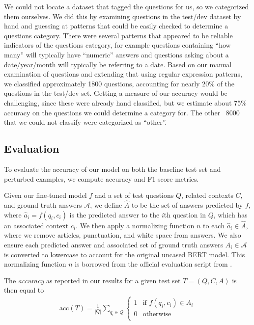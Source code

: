 \documentclass[11pt,a4paper]{article}
\begin{document}
We could not locate a dataset that tagged the questions for us, so we categorized them ourselves. We did this by examining questions in the test/dev dataset by hand and guessing at patterns that could be easily checked to determine a questions category. There were several patterns that appeared to be reliable indicators of the questions category, for example questions containing ``how many'' will typically have ``numeric'' answers and questions asking about a date/year/month will typically be referring to a date. Based on our manual examination of questions and extending that using regular expression patterns, we classified approximately 1800 questions, accounting for nearly 20\% of the questions  in the test/dev set. Getting a measure of our accuracy would be challenging, since these were already hand classified, but we estimate about 75\% accuracy on the questions we could determine a category for. The other ~8000 that we could not classify were categorized as ``other''.

\subsection{Evaluation}

To evaluate the accuracy of our model on both the baseline test set and perturbed examples, we compute accuracy and F1 score metrics.

Given our fine-tuned model $f$ and a set of test questions $Q$, related contexts $C$, and ground truth answers $\mathcal{A}$, we define $\hat{A}$ to be the set of answers predicted by $f$, where $\hat{a}_i=f(q_i, c_i)$ is the predicted answer to the $i$th question in $Q$, which has an associated context $c_i$. We then apply a normalizing function $n$ to each $\hat{a}_i\in \hat{A}$, where we remove articles, punctuation, and white space from answers. We also ensure each predicted answer and associated set of ground truth answers $A_i \in \mathcal{A}$ is converted to lowercase to account for the original uncased BERT model. This normalizing function $n$ is borrowed from the official evaluation script from \citet{rajpurkar2016squad}.

The \textit{accuracy} as reported in our results for a given test set $T=(Q, C, A)$  is then equal to
\begin{align*}
    \text{acc}(T) = \frac{1}{|Q|} \sum_{q_i \in Q} \begin{cases}
        1 & \text{if } f(q_i, c_i) \in A_i \\
        0 & \text{otherwise} \\
    \end{cases}
\end{align*}
\end{document}
